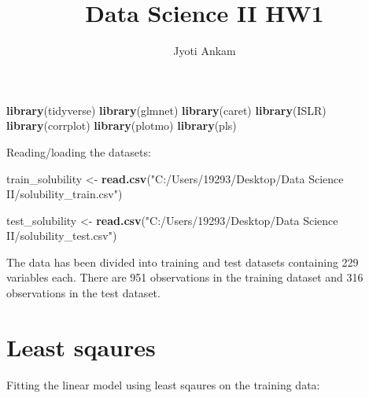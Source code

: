 \documentclass[]{article}
\title{Data Science II HW1}
\author{Jyoti Ankam}
\date{}
\newenvironment{Shaded}{\begin{snugshade}}{\end{snugshade}}
\newcommand{\KeywordTok}[1]{\textcolor[rgb]{0.13,0.29,0.53}{\textbf{#1}}}
\newcommand{\DataTypeTok}[1]{\textcolor[rgb]{0.13,0.29,0.53}{#1}}
\newcommand{\DecValTok}[1]{\textcolor[rgb]{0.00,0.00,0.81}{#1}}
\newcommand{\StringTok}[1]{\textcolor[rgb]{0.31,0.60,0.02}{#1}}
\newcommand{\OperatorTok}[1]{\textcolor[rgb]{0.81,0.36,0.00}{\textbf{#1}}}
\newcommand{\NormalTok}[1]{#1}
\begin{document}
\maketitle

\begin{Shaded}
\begin{Highlighting}[]
\KeywordTok{library}\NormalTok{(tidyverse)}
\KeywordTok{library}\NormalTok{(glmnet)}
\KeywordTok{library}\NormalTok{(caret)}
\KeywordTok{library}\NormalTok{(ISLR)}
\KeywordTok{library}\NormalTok{(corrplot)}
\KeywordTok{library}\NormalTok{(plotmo)}
\KeywordTok{library}\NormalTok{(pls)}
\end{Highlighting}
\end{Shaded}

Reading/loading the datasets:

\begin{Shaded}
\begin{Highlighting}[]
\NormalTok{train_solubility <-}\StringTok{ }\KeywordTok{read.csv}\NormalTok{(}\StringTok{"C:/Users/19293/Desktop/Data Science II/solubility_train.csv"}\NormalTok{) }

\NormalTok{test_solubility <-}\StringTok{ }\KeywordTok{read.csv}\NormalTok{(}\StringTok{"C:/Users/19293/Desktop/Data Science II/solubility_test.csv"}\NormalTok{)}
\end{Highlighting}
\end{Shaded}

The data has been divided into training and test datasets containing 229
variables each. There are 951 observations in the training dataset and
316 observations in the test dataset.

\section{Least sqaures}\label{least-sqaures}

Fitting the linear model using least sqaures on the training data:

\begin{Shaded}
\end{Shaded}
\end{document}
